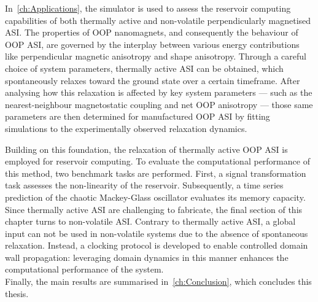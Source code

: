 In~\cref{ch:Applications}, the \hotspice simulator is used to assess the reservoir computing capabilities of both thermally active and non-volatile perpendicularly magnetised ASI.
The properties of OOP nanomagnets, and consequently the behaviour of OOP ASI, are governed by the interplay between various energy contributions like perpendicular magnetic anisotropy and shape anisotropy.
Through a careful choice of system parameters, thermally active ASI can be obtained, which spontaneously relaxes toward the ground state over a certain timeframe.
After analysing how this relaxation is affected by key system parameters --- such as the nearest-neighbour magnetostatic coupling and net OOP anisotropy --- those same parameters are then determined for manufactured OOP ASI by fitting simulations to the experimentally observed relaxation dynamics. \par
Building on this foundation, the relaxation of thermally active OOP ASI is employed for reservoir computing.
To evaluate the computational performance of this method, two benchmark tasks are performed.
First, a signal transformation task assesses the non-linearity of the reservoir.
Subsequently, a time series prediction of the chaotic Mackey-Glass oscillator evaluates its memory capacity.
Since thermally active ASI are challenging to fabricate, the final section of this chapter turns to non-volatile ASI.
Contrary to thermally active ASI, a global input can not be used  in non-volatile systems due to the absence of spontaneous relaxation.
Instead, a clocking protocol is developed to enable controlled domain wall propagation: leveraging domain dynamics in this manner enhances the computational performance of the system. \\

Finally, the main results are summarised in~\cref{ch:Conclusion}, which concludes this thesis.
